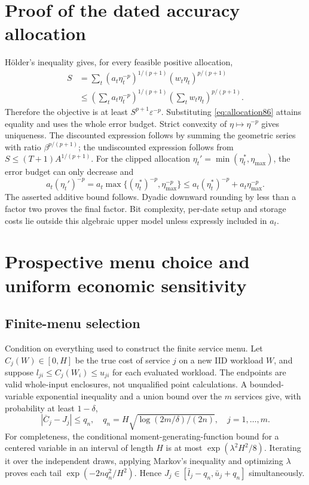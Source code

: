 \section{Proof of the dated accuracy allocation}\label{supp:allocation86}
H\"older's inequality gives, for every feasible positive allocation,
\begin{align*}
 S&=\sum_t(a_t\eta_t^{-p})^{1/(p+1)}(w_t\eta_t)^{p/(p+1)}\\
 &\le\left(\sum_ta_t\eta_t^{-p}\right)^{1/(p+1)}
       \left(\sum_tw_t\eta_t\right)^{p/(p+1)}.
\end{align*}
Therefore the objective is at least $S^{p+1}\varepsilon^{-p}$. Substituting \eqref{eq:allocation86} attains equality and uses the whole error budget. Strict convexity of $\eta\mapsto\eta^{-p}$ gives uniqueness. The discounted expression follows by summing the geometric series with ratio $\beta^{p/(p+1)}$; the undiscounted expression follows from $S\le(T+1)A^{1/(p+1)}$. For the clipped allocation $\eta_t'=\min(\eta_t^*,\eta_{\max})$, the error budget can only decrease and
\[
 a_t(\eta_t')^{-p}
 =a_t\max\{(\eta_t^*)^{-p},\eta_{\max}^{-p}\}
 \le a_t(\eta_t^*)^{-p}+a_t\eta_{\max}^{-p}.
\]
The asserted additive bound follows. Dyadic downward rounding by less than a factor two proves the final factor. Bit complexity, per-date setup and storage costs lie outside this algebraic upper model unless expressly included in $a_t$.

\section{Prospective menu choice and uniform economic sensitivity}\label{supp:prospective86}
\subsection{Finite-menu selection}
Condition on everything used to construct the finite service menu. Let $C_j(W)\in[0,H]$ be the true cost of service $j$ on a new IID workload $W$, and suppose $l_{ji}\le C_j(W_i)\le u_{ji}$ for each evaluated workload. The endpoints are valid whole-input enclosures, not unqualified point calculations. A bounded-variable exponential inequality and a union bound over the $m$ services give, with probability at least $1-\delta$,
\[
 |\overline C_j-J_j|\le q_n,
 \quad q_n=H\sqrt{\log(2m/\delta)/(2n)},\quad j=1,\ldots,m.
\]
For completeness, the conditional moment-generating-function bound for a centered variable in an interval of length $H$ is at most $\exp(\lambda^2H^2/8)$. Iterating it over the independent draws, applying Markov's inequality and optimizing $\lambda$ proves each tail $\exp(-2nq_n^2/H^2)$. Hence $J_j\in[\bar l_j-q_n,\bar u_j+q_n]$ simultaneously.


